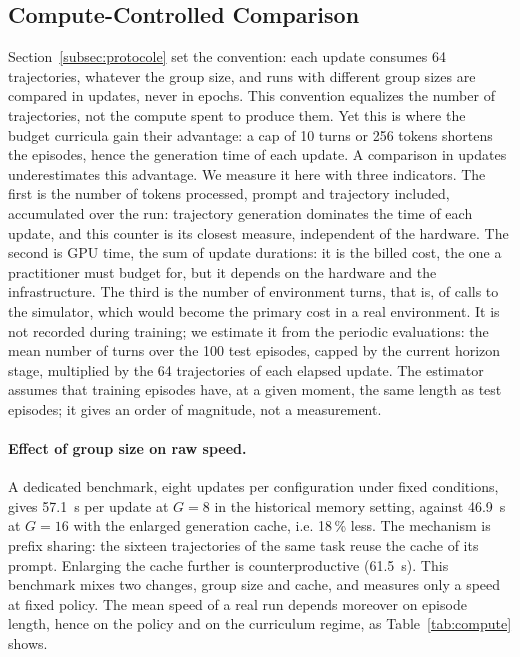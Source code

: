 \documentclass[11pt,a4paper]{article}
\begin{document}
\subsection{Compute-Controlled Comparison}
\label{subsec:compute-controle}

Section~\ref{subsec:protocole} set the convention: each update consumes 64 trajectories, whatever the group size, and runs with different group sizes are compared in updates, never in epochs. This convention equalizes the number of trajectories, not the compute spent to produce them. Yet this is where the budget curricula gain their advantage: a cap of 10 turns or 256 tokens shortens the episodes, hence the generation time of each update. A comparison in updates underestimates this advantage. We measure it here with three indicators. The first is the number of tokens processed, prompt and trajectory included, accumulated over the run: trajectory generation dominates the time of each update, and this counter is its closest measure, independent of the hardware. The second is GPU time, the sum of update durations: it is the billed cost, the one a practitioner must budget for, but it depends on the hardware and the infrastructure. The third is the number of environment turns, that is, of calls to the simulator, which would become the primary cost in a real environment. It is not recorded during training; we estimate it from the periodic evaluations: the mean number of turns over the 100 test episodes, capped by the current horizon stage, multiplied by the 64 trajectories of each elapsed update. The estimator assumes that training episodes have, at a given moment, the same length as test episodes; it gives an order of magnitude, not a measurement.

\paragraph{Effect of group size on raw speed.} A dedicated benchmark, eight updates per configuration under fixed conditions, gives 57.1~s per update at $G=8$ in the historical memory setting, against 46.9~s at $G=16$ with the enlarged generation cache, i.e. 18\,\% less. The mechanism is prefix sharing: the sixteen trajectories of the same task reuse the cache of its prompt. Enlarging the cache further is counterproductive (61.5~s). This benchmark mixes two changes, group size and cache, and measures only a speed at fixed policy. The mean speed of a real run depends moreover on episode length, hence on the policy and on the curriculum regime, as Table~\ref{tab:compute} shows.
\end{document}

